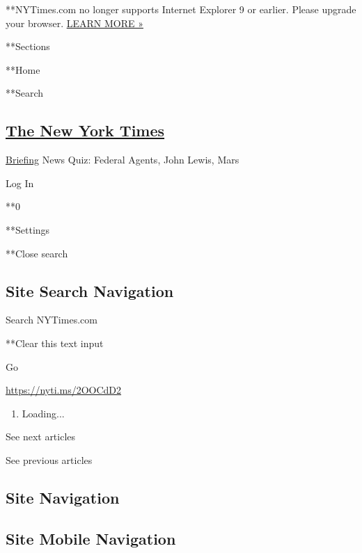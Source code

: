  **NYTimes.com no longer supports Internet Explorer 9 or earlier. Please
upgrade your browser.
\href{http://www.nytimes3xbfgragh.onion/content/help/site/ie9-support.html}{LEARN
MORE »}

**Sections

**Home

**Search

\hypertarget{the-new-york-times}{%
\subsection{\texorpdfstring{\href{http://www.nytimes3xbfgragh.onion/}{The
New York Times}}{The New York Times}}\label{the-new-york-times}}


\href{/interactive/2018/briefing/global-morning-briefing-newsletter-signup.html}{Briefing}
\textbar{}News Quiz: Federal Agents, John Lewis, Mars

Log In

**0

**Settings

**Close search

\hypertarget{site-search-navigation}{%
\subsection{Site Search Navigation}\label{site-search-navigation}}

Search NYTimes.com

**Clear this text input

Go

\url{https://nyti.ms/2OOCdD2}

\begin{enumerate}
\def\labelenumi{\arabic{enumi}.}
\item
  Loading...
\end{enumerate}

See next articles

See previous articles

\hypertarget{site-navigation}{%
\subsection{Site Navigation}\label{site-navigation}}

\hypertarget{site-mobile-navigation}{%
\subsection{Site Mobile Navigation}\label{site-mobile-navigation}}

